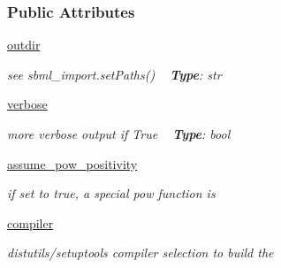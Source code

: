 \subsubsection*{Public Attributes}
\begin{DoxyCompactItemize}
\item 
\mbox{\label{classamici_1_1ode__export_1_1_o_d_e_exporter_aac4f80ee02f9c658ec0633be070b1c1b}} 
\mbox{\hyperlink{classamici_1_1ode__export_1_1_o_d_e_exporter_aac4f80ee02f9c658ec0633be070b1c1b}{outdir}}
\begin{DoxyCompactList}\small\item\em see sbml\+\_\+import.\+set\+Paths() ~\newline
{\bfseries Type}\+: str \end{DoxyCompactList}\item 
\mbox{\label{classamici_1_1ode__export_1_1_o_d_e_exporter_aa9e289eddb591991c9bc7321dc5b186b}} 
\mbox{\hyperlink{classamici_1_1ode__export_1_1_o_d_e_exporter_aa9e289eddb591991c9bc7321dc5b186b}{verbose}}
\begin{DoxyCompactList}\small\item\em more verbose output if True ~\newline
{\bfseries Type}\+: bool \end{DoxyCompactList}\item 
\mbox{\label{classamici_1_1ode__export_1_1_o_d_e_exporter_a29c4626a170365ee3773218f11565690}} 
\mbox{\hyperlink{classamici_1_1ode__export_1_1_o_d_e_exporter_a29c4626a170365ee3773218f11565690}{assume\+\_\+pow\+\_\+positivity}}
\begin{DoxyCompactList}\small\item\em if set to true, a special pow function is \end{DoxyCompactList}\item 
\mbox{\label{classamici_1_1ode__export_1_1_o_d_e_exporter_a3da8f16c6fe93b3b56fc83d5ceda9ead}} 
\mbox{\hyperlink{classamici_1_1ode__export_1_1_o_d_e_exporter_a3da8f16c6fe93b3b56fc83d5ceda9ead}{compiler}}
\begin{DoxyCompactList}\small\item\em distutils/setuptools compiler selection to build the \end{DoxyCompactList}\item 

\end{DoxyCompactItemize}
